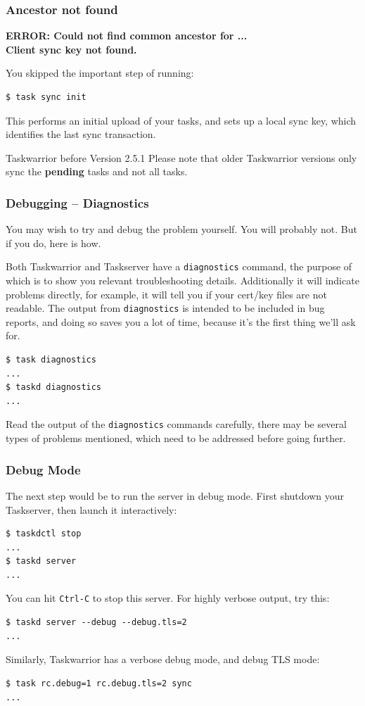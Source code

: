 \documentclass[t,handout]{beamer}
\begin{document}
\begin{frame}[fragile]\frametitle{Ancestor not found}
    \textbf{ERROR: Could not find common ancestor for ...\\
Client sync key not found.}

    You skipped the important step of running:
    \begin{lstlisting}
$ task sync init\end{lstlisting}

    This performs an initial upload of your tasks, and sets up a local sync key, which identifies the last sync transaction.

    \begin{alertblock}{Taskwarrior before Version 2.5.1}
        Please note that older Taskwarrior versions only sync the \textbf{pending} tasks and not all tasks.
    \end{alertblock}
\end{frame}

\begin{frame}[fragile]\frametitle{Debugging -- Diagnostics}
      You may wish to try and debug the problem yourself. You will probably not. But if you do, here is how.

      Both Taskwarrior and Taskserver have a \verb+diagnostics+ command, the purpose of which is to show you relevant troubleshooting details. Additionally it will indicate problems directly, for example, it will tell you if your cert/key files are not readable. The output from \verb+diagnostics+ is intended to be included in bug reports, and doing so saves you a lot of time, because it's the first thing we'll ask for.

      \begin{lstlisting}
$ task diagnostics
...
$ taskd diagnostics
...\end{lstlisting}

    Read the output of the \verb+diagnostics+ commands carefully, there may be several types of problems mentioned, which need to be addressed before going further.
\end{frame}

\begin{frame}[fragile]\frametitle{Debug Mode}
    The next step would be to run the server in debug mode. First shutdown your Taskserver, then launch it interactively:

    \begin{lstlisting}
$ taskdctl stop
...
$ taskd server
...\end{lstlisting}

    You can hit \verb+Ctrl-C+ to stop this server. For highly verbose output, try this:
    \begin{lstlisting}
$ taskd server --debug --debug.tls=2
...\end{lstlisting}

    Similarly, Taskwarrior has a verbose debug mode, and debug TLS mode:
    \begin{lstlisting}
$ task rc.debug=1 rc.debug.tls=2 sync
...\end{lstlisting}
\end{frame}
\end{document}
